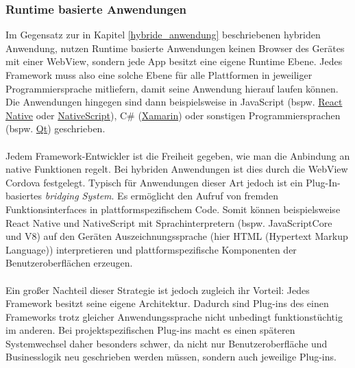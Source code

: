 \subsubsection{Runtime basierte Anwendungen}
\label{runtime_based_apps}
Im Gegensatz zur in Kapitel \ref{hybride_anwendung} beschriebenen hybriden Anwendung, nutzen Runtime basierte Anwendungen keinen Browser des Gerätes mit einer WebView, sondern jede App besitzt eine eigene Runtime Ebene. 
Jedes Framework muss also eine solche Ebene für alle Plattformen in jeweiliger Programmiersprache mitliefern, damit seine Anwendung hierauf laufen können.
Die Anwendungen hingegen sind dann beispielsweise in JavaScript (bspw. \href{https://reactnative.dev/}{React Native} oder \href{https://nativescript.org/}{NativeScript}), C\# (\href{https://dotnet.microsoft.com/apps/xamarin}{Xamarin}) oder sonstigen Programmiersprachen (bspw. \href{https://www.qt.io/}{Qt}) geschrieben.\\
\\
Jedem Framework-Entwickler ist die Freiheit gegeben, wie man die Anbindung an native Funktionen regelt. Bei hybriden Anwendungen ist dies durch die WebView Cordova festgelegt.
Typisch für Anwendungen dieser Art jedoch ist ein Plug-In-basiertes \textit{bridging System}. Es ermöglicht den Aufruf von fremden Funktionsinterfaces in plattformspezifischem Code.
Somit können beispielsweise React Native und NativeScript mit Sprachinterpretern (bspw. JavaScriptCore und V8) auf den Geräten Auszeichnungssprache (hier HTML (Hypertext Markup Language)) interpretieren und plattformspezifische Komponenten der Benutzeroberflächen erzeugen.\\
\\
Ein großer Nachteil dieser Strategie ist jedoch zugleich ihr Vorteil: Jedes Framework besitzt seine eigene Architektur. Dadurch sind Plug-ins des einen Frameworks trotz gleicher Anwendungssprache nicht unbedingt funktionstüchtig im anderen. 
Bei projektspezifischen Plug-ins macht es einen späteren Systemwechsel daher besonders schwer, da nicht nur Benutzeroberfläche und Businesslogik neu geschrieben werden müssen, sondern auch jeweilige Plug-ins. \cite{bjorn-hansen2020}

